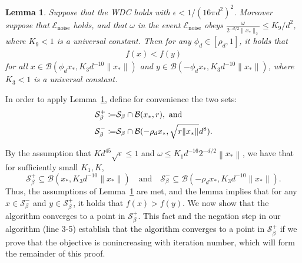 \documentclass[11pt]{article}
\newtheorem{lemma}[theorem]{Lemma}
\newcommand{\eps}{\epsilon}
\newcommand{\xo}{x_\ast}
\newcommand\defeq{\coloneqq}
\newcommand{\Tnorm}{}
\newcommand\norm[2][\Tnorm]{\ensuremath{{\left\|#2\right\|}_{#1}}}
\newcommand\setS{\mathcal S}
\newcommand\eventnoisesmall{\mathcal E_{\text{noise}}}
\begin{document}
\begin{lemma} \label{GA:le14}
Suppose that the WDC holds with $\eps < 1 / (16 \pi d^2)^2$.
Moreover suppose that $\eventnoisesmall$ holds, and that $\omega$ in the event $\eventnoisesmall$ obeys
$\frac{ \omega }{2^{-d/2} \|\xo\|_2} \leq K_9 / d^2$, where $K_9<1$ is a universal constant. Then for any $\phi_d \in [\rho_d, 1]$, it holds that
\begin{align} \label{GA:e25}
f(x) < f(y)
\end{align}
for all $x \in \mathcal{B}(\phi_d x_*, K_3 d^{-10} \|x_*\|)$ and $y \in \mathcal{B}(- \phi_d x_*, K_3 d^{-10} \|x_*\|)$, where $K_3 < 1$ is a universal constant.
\end{lemma}

In order to apply Lemma~\ref{GA:le14}, define for convenience the two sets:
\begin{align*}
\setS_\beta^+ \defeq&  \setS_\beta \cap \mathcal{B}(x_*, r), \hbox{ and }\\
\setS_\beta^- \defeq&  \setS_\beta \cap \mathcal{B}(- \rho_d x_*, \sqrt{r \norm{\xo}} d^8 ).
\end{align*}

By the assumption that $K d^{45} \sqrt{\eps} \leq 1$ and $\omega \leq K_1 d^{-16} 2^{-d/2} \norm{\xo}$, we have that for sufficiently small $K_1, K$,
\[
\setS_\beta^+
\subseteq
\mathcal{B}(x_*, K_3 d^{-10} \|x_*\|)
\quad
\text{and}
\quad
\setS_\beta^-
\subseteq
\mathcal{B}(- \rho_d x_*, K_3 d^{-10} \|x_*\|).
\]
Thus, the assumptions of Lemma~\ref{GA:le14} are met, and the lemma implies that for any $x \in \setS_{\beta}^-$ and $y \in \setS_{\beta}^+$, it holds that $f(x) > f(y)$.
 We now show that the algorithm converges to a point in $\setS_\beta^+$.  This fact and the negation step in our algorithm (line 3-5) establish that the algorithm converges to a point in $\setS_\beta^+$ if we prove that the objective is nonincreasing with iteration number, which will form the remainder of this proof.
\end{document}
